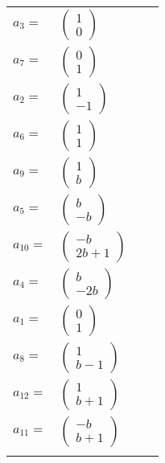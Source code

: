 \documentclass[1p]{elsarticle_modified}
\theoremstyle{definition}
\begin{document}
\begin{tabular}{m{7pt} m{180pt} m{7pt} m{180pt} }
\flushright $a_{3}=$&$\begin{pmatrix}1\\0\end{pmatrix}$ \\
\flushright $a_{7}=$&$\begin{pmatrix}0\\1\end{pmatrix}$ \\
\flushright $a_{2}=$&$\begin{pmatrix}1\\-1\end{pmatrix}$ \\
\flushright $a_{6}=$&$\begin{pmatrix}1\\1\end{pmatrix}$ \\
\flushright $a_{9}=$&$\begin{pmatrix}1\\b\end{pmatrix}$ \\
\flushright $a_{5}=$&$\begin{pmatrix}b\\- b\end{pmatrix}$ \\
\flushright $a_{10}=$&$\begin{pmatrix}- b\\2 b+1\end{pmatrix}$ \\
\flushright $a_{4}=$&$\begin{pmatrix}b\\-2 b\end{pmatrix}$ \\
\flushright $a_{1}=$&$\begin{pmatrix}0\\1\end{pmatrix}$ \\
\flushright $a_{8}=$&$\begin{pmatrix}1\\b-1\end{pmatrix}$ \\
\flushright $a_{12}=$&$\begin{pmatrix}1\\b+1\end{pmatrix}$ \\
\flushright $a_{11}=$&$\begin{pmatrix}- b\\b+1\end{pmatrix}$\\&\end{tabular}
\end{document}
